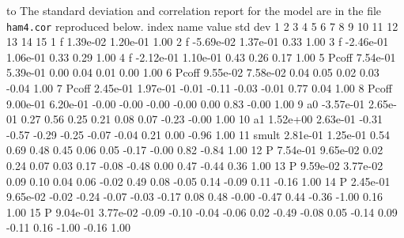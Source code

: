 \documentclass[12pt]{book}
\begin{document}
\medskip
\vbox{
\hbox to}
\medskip
\bigskip
\vbox{
The standard deviation and correlation report for the model are 
in the file {\tt ham4.cor} reproduced below.
\htmlbegintex
{ \openup -2pt
\obeylines\obeyspaces\ttsix
 index name  value    std dev    1     2     3     4     5     6     7     8     9    10    11    12    13    14   15   
   1  f      1.39e-02 1.20e-01  1.00
   2  f     -5.69e-02 1.37e-01  0.33  1.00
   3  f     -2.46e-01 1.06e-01  0.33  0.29  1.00
   4  f     -2.12e-01 1.10e-01  0.43  0.26  0.17  1.00
   5  Pcoff  7.54e-01 5.39e-01  0.00  0.04  0.01  0.00  1.00
   6  Pcoff  9.55e-02 7.58e-02  0.04  0.05  0.02  0.03 -0.04  1.00
   7  Pcoff  2.45e-01 1.97e-01 -0.01 -0.11 -0.03 -0.01  0.77  0.04  1.00
   8  Pcoff  9.00e-01 6.20e-01 -0.00 -0.00 -0.00 -0.00  0.00  0.83 -0.00  1.00
   9  a0    -3.57e-01 2.65e-01  0.27  0.56  0.25  0.21  0.08  0.07 -0.23 -0.00  1.00
  10  a1     1.52e+00 2.63e-01 -0.31 -0.57 -0.29 -0.25 -0.07 -0.04  0.21  0.00 -0.96  1.00
  11  smult  2.81e-01 1.25e-01  0.54  0.69  0.48  0.45  0.06  0.05 -0.17 -0.00  0.82 -0.84  1.00
  12  P      7.54e-01 9.65e-02  0.02  0.24  0.07  0.03  0.17 -0.08 -0.48  0.00  0.47 -0.44  0.36  1.00
  13  P      9.59e-02 3.77e-02  0.09  0.10  0.04  0.06 -0.02  0.49  0.08 -0.05  0.14 -0.09  0.11 -0.16  1.00
  14  P      2.45e-01 9.65e-02 -0.02 -0.24 -0.07 -0.03 -0.17  0.08  0.48 -0.00 -0.47  0.44 -0.36 -1.00  0.16  1.00
  15  P      9.04e-01 3.77e-02 -0.09 -0.10 -0.04 -0.06  0.02 -0.49 -0.08  0.05 -0.14  0.09 -0.11  0.16 -1.00 -0.16 1.00
}
} %
\end{document}
